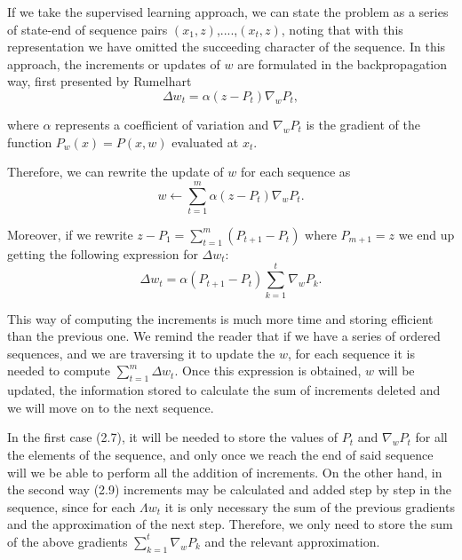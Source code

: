 \documentclass[12pt]{article}
\numberwithin{equation}{section}
\begin{document}
 If we take the supervised learning approach, we can state the problem as a series of state-end of sequence pairs $(x_1,z)$,....,$(x_t,z)$, noting that with this representation we have omitted the succeeding character of the sequence. In this approach, the increments or updates of $w$ are formulated in the backpropagation way, first presented by Rumelhart \cite{rumelhart1985learning} 
\begin{equation}
    \Delta w_t =\alpha(z-P_t)\nabla_w P_t,
\end{equation}

where $\alpha$ represents a coefficient of variation and $\nabla_w P_t$ is the gradient of the function $P_{w}(x)=P(x,w)$ evaluated at $x_t$.


Therefore, we can rewrite the update of $w$ for each sequence as
\begin{equation}
 w \longleftarrow \sum_{t=1}^{m}\alpha(z-P_t)\nabla_w P_t.
\end{equation}

Moreover, if we rewrite \hspace{1mm}  $z-P_1=\sum_{t=1}^{m}(P_{t+1}-P_{t})$ \hspace{1mm}  where  \hspace{1mm} $P_{m+1}=z$ we end up getting the following expression for $\Delta w_t$:
\begin{equation}
    \Delta w_t= \alpha (P_{t+1}-P_{t}) \sum_{k=1}^{t} \nabla_w P_k.
\end{equation}


This way of computing the increments is much more time and storing efficient than the previous one. We remind the reader that if we have a series of ordered sequences, and we are traversing it to update the $w$, for each sequence it is needed to compute $\sum_{t=1 }^{m} \Delta w_t$. Once this expression  is obtained, $w$ will be updated, the information stored to calculate the sum of increments 
 deleted and  we will move on to the next sequence.


In the first case (2.7), it will be needed to store the values of $P_t$ and $\nabla_w P_t$ for all the elements of the sequence, and only once we reach the end of said sequence will we be able to perform all the addition of increments. On the other hand, in the second way (2.9)  increments may be calculated and added step by step in the sequence, since for each $\Lambda w_t$ it is only necessary the sum of the previous gradients and the approximation of the next step. Therefore, we only need to store the sum of the above gradients $\sum_{k=1}^{t} \nabla_w P_k$ and the relevant approximation.
\end{document}
